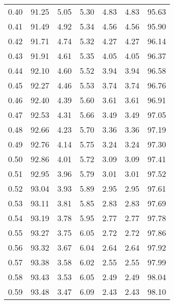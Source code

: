 \begin{tabular}{|c|c|c|c|c|c|c|}
      0.40 &     91.25 &      5.05 &       5.30 &    4.83 &       4.83 &         95.63 \\
      0.41 &     91.49 &      4.92 &       5.34 &    4.56 &       4.56 &         95.90 \\
      0.42 &     91.71 &      4.74 &       5.32 &    4.27 &       4.27 &         96.14 \\
      0.43 &     91.91 &      4.61 &       5.35 &    4.05 &       4.05 &         96.37 \\
      0.44 &     92.10 &      4.60 &       5.52 &    3.94 &       3.94 &         96.58 \\
      0.45 &     92.27 &      4.46 &       5.53 &    3.74 &       3.74 &         96.76 \\
      0.46 &     92.40 &      4.39 &       5.60 &    3.61 &       3.61 &         96.91 \\
      0.47 &     92.53 &      4.31 &       5.66 &    3.49 &       3.49 &         97.05 \\
      0.48 &     92.66 &      4.23 &       5.70 &    3.36 &       3.36 &         97.19 \\
      0.49 &     92.76 &      4.14 &       5.75 &    3.24 &       3.24 &         97.30 \\
      0.50 &     92.86 &      4.01 &       5.72 &    3.09 &       3.09 &         97.41 \\
      0.51 &     92.95 &      3.96 &       5.79 &    3.01 &       3.01 &         97.52 \\
      0.52 &     93.04 &      3.93 &       5.89 &    2.95 &       2.95 &         97.61 \\
      0.53 &     93.11 &      3.81 &       5.85 &    2.83 &       2.83 &         97.69 \\
      0.54 &     93.19 &      3.78 &       5.95 &    2.77 &       2.77 &         97.78 \\
      0.55 &     93.27 &      3.75 &       6.05 &    2.72 &       2.72 &         97.86 \\
      0.56 &     93.32 &      3.67 &       6.04 &    2.64 &       2.64 &         97.92 \\
      0.57 &     93.38 &      3.58 &       6.02 &    2.55 &       2.55 &         97.99 \\
      0.58 &     93.43 &      3.53 &       6.05 &    2.49 &       2.49 &         98.04 \\
      0.59 &     93.48 &      3.47 &       6.09 &    2.43 &       2.43 &         98.10 \\

\end{tabular}
